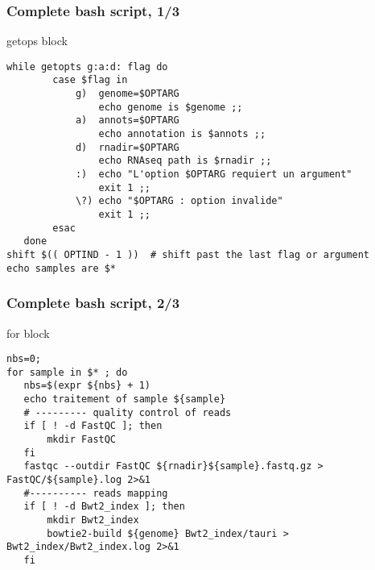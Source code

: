 \begin{frame}[containsverbatim]
\frametitle{Complete bash script, 1/3}
\begin{exampleblock}{getops block}
\begin{lstlisting}
while getopts g:a:d: flag do
        case $flag in
            g)  genome=$OPTARG
                echo genome is $genome ;;
            a)  annots=$OPTARG
                echo annotation is $annots ;;
            d)  rnadir=$OPTARG
                echo RNAseq path is $rnadir ;;
            :)  echo "L'option $OPTARG requiert un argument"
                exit 1 ;;
            \?) echo "$OPTARG : option invalide"
                exit 1 ;;
        esac
   done
shift $(( OPTIND - 1 ))  # shift past the last flag or argument
echo samples are $*
\end{lstlisting}
\end{exampleblock}
\end{frame}
\begin{frame}[containsverbatim]
\frametitle{Complete bash script, 2/3}
\begin{exampleblock}{for block}
\begin{lstlisting}
nbs=0;
for sample in $* ; do 
   nbs=$(expr ${nbs} + 1)
   echo traitement of sample ${sample}
   # --------- quality control of reads
   if [ ! -d FastQC ]; then
       mkdir FastQC
   fi
   fastqc --outdir FastQC ${rnadir}${sample}.fastq.gz > FastQC/${sample}.log 2>&1
   #---------- reads mapping
   if [ ! -d Bwt2_index ]; then
       mkdir Bwt2_index
       bowtie2-build ${genome} Bwt2_index/tauri > Bwt2_index/Bwt2_index.log 2>&1
   fi
\end{lstlisting}
\end{exampleblock}
\end{frame}
